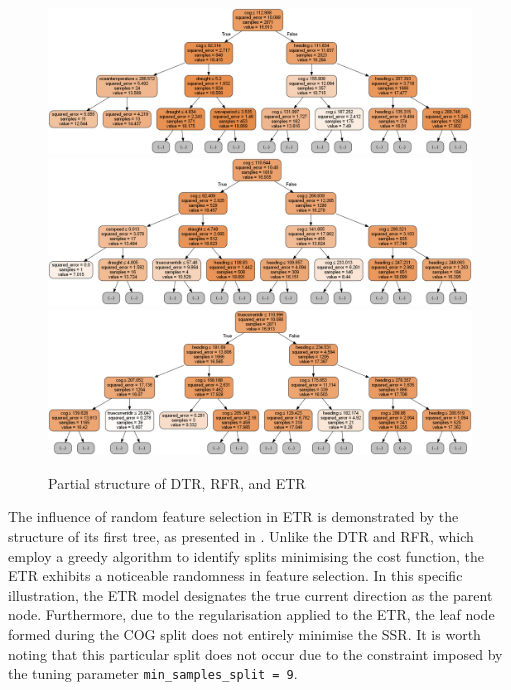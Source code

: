 
\begin{figure}
    \centering
    \includegraphics[width=.9\textwidth]{02_figures/dtr_mod_1tree.png}\\
    \includegraphics[width=.9\textwidth]{02_figures/rfr_mod_it1.png}\\
    \includegraphics[width=.9\textwidth]{02_figures/etr_mod_it1.png}
    \caption{Partial structure of DTR, RFR, and ETR}
    \label{fig:overall_tree_partial_structure}
\end{figure}

The influence of random feature selection in ETR is demonstrated by the structure of its first tree, as presented in . Unlike the DTR and RFR, which employ a greedy algorithm to identify splits minimising the cost function, the ETR exhibits a noticeable randomness in feature selection. In this specific illustration, the ETR model designates the true current direction as the parent node. Furthermore, due to the regularisation applied to the ETR, the leaf node formed during the COG split does not entirely minimise the SSR. It is worth noting that this particular split does not occur due to the constraint imposed by the tuning parameter {\tt min\_samples\_split = 9}.\\

